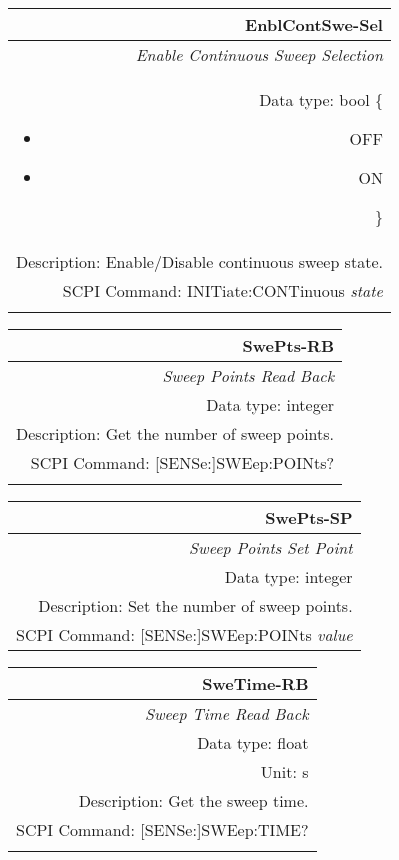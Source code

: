 \documentclass[openany]{article}
\begin{document}
		\begin{tabular}{N}
			\hline
			\bfseries EnblContSwe-Sel \\ \hline
			\emph{Enable Continuous Sweep Selection} \\
			Data type: bool \{\begin{itemize}[noitemsep]
				\small
				\item[] OFF
				\item[] ON
			\end{itemize}\} \\
			Description: Enable/Disable continuous sweep state. \\
			SCPI Command: INITiate:CONTinuous \emph{state} \\
			\\

		\end{tabular}

		\begin{tabular}{N}
			\hline
			\bfseries SwePts-RB \\ \hline
			\emph{Sweep Points Read Back} \\
			Data type: integer \\
			Description: Get the number of sweep points. \\
			SCPI Command: [SENSe:]SWEep:POINts? \\
			\\

		\end{tabular}

		\begin{tabular}{N}
			\hline
			\bfseries SwePts-SP \\ \hline
			\emph{Sweep Points Set Point} \\
			Data type: integer \\
			Description: Set the number of sweep points. \\
			SCPI Command: [SENSe:]SWEep:POINts \emph{value} \\

		\end{tabular}

		\begin{tabular}{N}
			\hline
			\bfseries SweTime-RB \\ \hline
			\emph{Sweep Time Read Back} \\
			Data type: float \\
			Unit: s \\
			Description: Get the sweep time. \\
			SCPI Command: [SENSe:]SWEep:TIME? \\
			\\

		\end{tabular}
\end{document}
